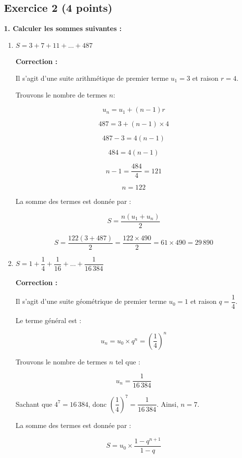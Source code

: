 \documentclass{article}
\begin{document}
\bigskip

\subsection*{Exercice 2 (4 points)}

\textbf{1. Calculer les sommes suivantes :}

\begin{enumerate}[label=\alph*)]

\item \( S = 3 + 7 + 11 + \dots + 487 \)

\textbf{Correction :}

Il s'agit d'une suite arithmétique de premier terme \( u_1 = 3 \) et raison \( r = 4 \).

Trouvons le nombre de termes \( n \):

\[ u_n = u_1 + (n - 1) r \]

\[ 487 = 3 + (n - 1) \times 4 \]

\[ 487 - 3 = 4 (n - 1) \]

\[ 484 = 4 (n - 1) \]

\[ n - 1 = \dfrac{484}{4} = 121 \]

\[ n = 122 \]

La somme des termes est donnée par :

\[ S = \dfrac{n (u_1 + u_n)}{2} \]

\[ S = \dfrac{122 (3 + 487)}{2} = \dfrac{122 \times 490}{2} = 61 \times 490 = 29\,890 \]

\bigskip

\item \( S = 1 + \dfrac{1}{4} + \dfrac{1}{16} + \dots + \dfrac{1}{16\,384} \)

\textbf{Correction :}

Il s'agit d'une suite géométrique de premier terme \( u_0 = 1 \) et raison \( q = \dfrac{1}{4} \).

Le terme général est :

\[ u_n = u_0 \times q^n = \left( \dfrac{1}{4} \right)^n \]

Trouvons le nombre de termes \( n \) tel que :

\[ u_n = \dfrac{1}{16\,384} \]

Sachant que \( 4^{7} = 16\,384 \), donc \( \left( \dfrac{1}{4} \right)^7 = \dfrac{1}{16\,384} \). Ainsi, \( n = 7 \).

La somme des termes est donnée par :

\[ S = u_0 \times \dfrac{1 - q^{n+1}}{1 - q} \]


\end{enumerate}
\end{document}
